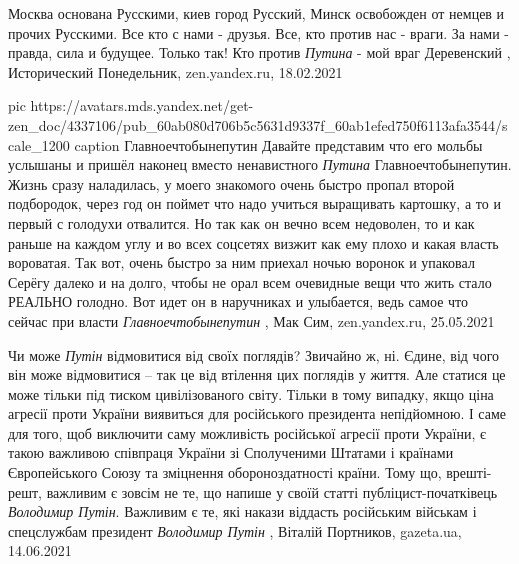 Москва основана Русскими, киев город Русский, Минск освобожден от немцев и
прочих Русскими. Все кто с нами - друзья. Все, кто против нас - враги.  За нами
- правда, сила и будущее. Только так! Кто против \emph{Путина} - мой враг
Деревенский
, 
Исторический Понедельник, zen.yandex.ru, 18.02.2021

\ifcmt
  pic https://avatars.mds.yandex.net/get-zen_doc/4337106/pub_60ab080d706b5c5631d9337f_60ab1efed750f6113afa3544/scale_1200
	caption Главноечтобынепутин
\fi
Давайте представим что его мольбы услышаны и пришёл наконец вместо ненавистного
\emph{Путина} Главноечтобынепутин. Жизнь сразу наладилась, у моего знакомого очень
быстро пропал второй подбородок, через год он поймет что надо учиться
выращивать картошку, а то и первый с голодухи отвалится. Но так как он вечно
всем недоволен, то и как раньше на каждом углу и во всех соцсетях визжит как
ему плохо и какая власть вороватая. Так вот, очень быстро за ним приехал ночью
воронок и упаковал Серёгу далеко и на долго, чтобы не орал всем очевидные вещи
что жить стало РЕАЛЬНО голодно. Вот идет он в наручниках и улыбается, ведь
самое что сейчас при власти \emph{Главноечтобынепутин}
, Мак Сим, zen.yandex.ru, 25.05.2021

Чи може \emph{Путін} відмовитися від своїх поглядів? Звичайно ж, ні. Єдине, від чого
він може відмовитися – так це від втілення цих поглядів у життя. Але статися це
може тільки під тиском цивілізованого світу. Тільки в тому випадку, якщо ціна
агресії проти України виявиться для російського президента непідйомною. І саме
для того, щоб виключити саму можливість російської агресії проти України, є
такою важливою співпраця України зі Сполученими Штатами і країнами
Європейського Союзу та зміцнення обороноздатності країни.  Тому що,
врешті-решт, важливим є зовсім не те, що напише у своїй статті
публіцист-початківець \emph{Володимир Путін}. Важливим є те, які накази віддасть
російським військам і спецслужбам президент \emph{Володимир Путін}
, 
Віталій Портников, gazeta.ua, 14.06.2021

